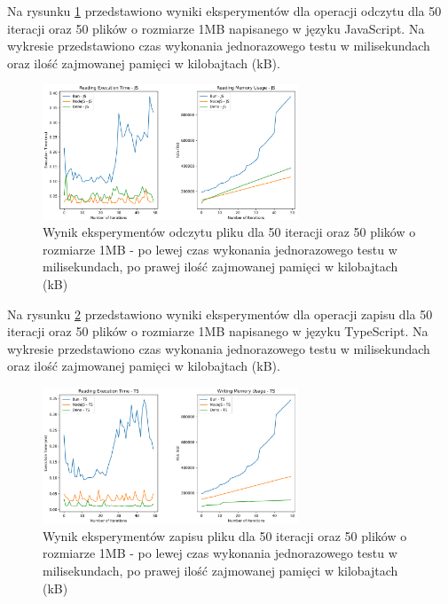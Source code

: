Na rysunku \ref{fig:file_e2_writing_js} przedstawiono wyniki eksperymentów dla operacji odczytu dla 50 iteracji oraz 50 plików o rozmiarze 1MB napisanego w języku JavaScript. Na wykresie przedstawiono czas wykonania jednorazowego testu w milisekundach oraz ilość zajmowanej pamięci w kilobajtach (kB).

\begin{figure}[H]
  \centering
  \includegraphics[width=0.68\textwidth]{Figures/files/files_reading_50_2000_50_js.png}
  \caption{Wynik eksperymentów odczytu pliku dla 50 iteracji oraz 50 plików o rozmiarze 1MB - po lewej czas wykonania jednorazowego testu w milisekundach, po prawej ilość zajmowanej pamięci w kilobajtach (kB)}
  \label{fig:file_e2_writing_js}
\end{figure}

Na rysunku \ref{fig:file_e2_reading_ts} przedstawiono wyniki eksperymentów dla operacji zapisu dla 50 iteracji oraz 50 plików o rozmiarze 1MB napisanego w języku TypeScript. Na wykresie przedstawiono czas wykonania jednorazowego testu w milisekundach oraz ilość zajmowanej pamięci w kilobajtach (kB).

\begin{figure}[H]
  \centering
  \includegraphics[width=0.68\textwidth]{Figures/files/files_reading_50_2000_50_ts.png}
  \caption{Wynik eksperymentów zapisu pliku dla 50 iteracji oraz 50 plików o rozmiarze 1MB - po lewej czas wykonania jednorazowego testu w milisekundach, po prawej ilość zajmowanej pamięci w kilobajtach (kB)}
  \label{fig:file_e2_reading_ts}
\end{figure}

